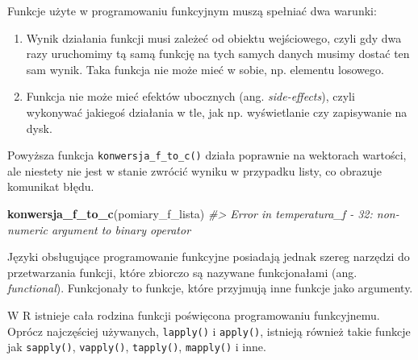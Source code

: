 \documentclass[paper=6in:9in,pagesize=pdftex,headinclude=on,footinclude=on,10pt]{scrbook}
\makeatletter
\newenvironment{Shaded}{\begin{snugshade}}{\end{snugshade}}
\newcommand{\CommentTok}[1]{\textcolor[rgb]{0.56,0.35,0.01}{\textit{#1}}}
\newcommand{\KeywordTok}[1]{\textcolor[rgb]{0.13,0.29,0.53}{\textbf{#1}}}
\newcommand{\NormalTok}[1]{#1}
\providecommand{\tightlist}{%
  \setlength{\itemsep}{0pt}\setlength{\parskip}{0pt}}
\newenvironment{kframe}{%
\medskip{}
\setlength{\fboxsep}{.8em}
 \def\at@end@of@kframe{}%
 \ifinner\ifhmode%
  \def\at@end@of@kframe{\end{minipage}}%
  \begin{minipage}{\columnwidth}%
 \fi\fi%
 \def\FrameCommand##1{\hskip\@totalleftmargin \hskip-\fboxsep
 \colorbox{shadecolor}{##1}\hskip-\fboxsep
     \hskip-\linewidth \hskip-\@totalleftmargin \hskip\columnwidth}%
 \MakeFramed {\advance\hsize-\width
   \@totalleftmargin\z@ \linewidth\hsize
   \@setminipage}}%
 {\par\unskip\endMakeFramed%
 \at@end@of@kframe}
\newenvironment{rmdblock}[1]
  {
  \begin{itemize}
  \renewcommand{\labelitemi}{
    \raisebox{-.7\height}[0pt][0pt]{
      {\setkeys{Gin}{width=3em,keepaspectratio}\texttt{[image: images/\#1]}}
    }
  }
  \setlength{\fboxsep}{1em}
  \begin{kframe}
  \item
  }
  {
  \end{kframe}
  \end{itemize}
  }
\newenvironment{rmdinfo}
  {\begin{rmdblock}{compass}}
  {\end{rmdblock}}
\makeatother
\begin{document}
\begin{rmdinfo}
\begin{rmdinfo}

Funkcje użyte w programowaniu funkcyjnym muszą spełniać dwa warunki:

\begin{enumerate}
\def\labelenumi{\arabic{enumi}.}
\tightlist
\item
  Wynik działania funkcji musi zależeć od obiektu wejściowego, czyli gdy dwa razy uruchomimy tą samą funkcję na tych samych danych musimy dostać ten sam wynik.
  Taka funkcja nie może mieć w sobie, np. elementu losowego.
\item
  Funkcja nie może mieć efektów ubocznych (ang. \emph{side-effects}), czyli wykonywać jakiegoś działania w tle, jak np. wyświetlanie czy zapisywanie na dysk.
\end{enumerate}

\end{rmdinfo}
\end{rmdinfo}

Powyższa funkcja \texttt{konwersja\_f\_to\_c()} działa poprawnie na wektorach wartości, ale niestety nie jest w stanie zwrócić wyniku w przypadku listy, co obrazuje komunikat błędu.

\begin{Shaded}
\begin{Highlighting}[]
\KeywordTok{konwersja_f_to_c}\NormalTok{(pomiary_f_lista)}
\CommentTok{#> Error in temperatura_f - 32: non-numeric argument to binary operator}
\end{Highlighting}
\end{Shaded}

Języki obsługujące programowanie funkcyjne posiadają jednak szereg narzędzi do przetwarzania funkcji, które zbiorczo są nazywane funkcjonałami (ang. \emph{functional}).
Funkcjonały to funkcje, które przyjmują inne funkcje jako argumenty.

\begin{rmdinfo}
\begin{rmdinfo}

W R istnieje cała rodzina funkcji poświęcona programowaniu funkcyjnemu.
Oprócz najczęściej używanych, \texttt{lapply()} i \texttt{apply()}, istnieją również takie funkcje jak \texttt{sapply()}, \texttt{vapply()}, \texttt{tapply()}, \texttt{mapply()} i inne.

\end{rmdinfo}
\end{rmdinfo}
\end{document}
